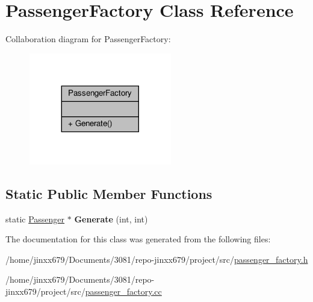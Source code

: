 \hypertarget{classPassengerFactory}{}\section{Passenger\+Factory Class Reference}
\label{classPassengerFactory}


Collaboration diagram for Passenger\+Factory\+:\nopagebreak
\begin{figure}[H]
\begin{center}
\leavevmode
\includegraphics[width=176pt]{classPassengerFactory__coll__graph}
\end{center}
\end{figure}
\subsection*{Static Public Member Functions}
\begin{DoxyCompactItemize}
\item 
\mbox{\label{classPassengerFactory_a2952ba78ceb285f445bc768d287230d2}} 
static \hyperlink{classPassenger}{Passenger} $\ast$ {\bfseries Generate} (int, int)
\end{DoxyCompactItemize}


The documentation for this class was generated from the following files\+:\begin{DoxyCompactItemize}
\item 
/home/jinxx679/\+Documents/3081/repo-\/jinxx679/project/src/\hyperlink{passenger__factory_8h}{passenger\+\_\+factory.\+h}\item 
/home/jinxx679/\+Documents/3081/repo-\/jinxx679/project/src/\hyperlink{passenger__factory_8cc}{passenger\+\_\+factory.\+cc}\end{DoxyCompactItemize}
